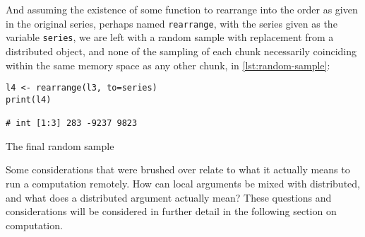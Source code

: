 And assuming the existence of some function to rearrange into the order
as given in the original series, perhaps named \texttt{rearrange}, with
the series given as the variable \texttt{series}, we are left with a
random sample with replacement from a distributed object, and none of
the sampling of each chunk necessarily coinciding within the same memory
space as any other chunk, in \ref{lst:random-sample}:

\begin{listing}
    \begin{verbatim}
l4 <- rearrange(l3, to=series)
print(l4)

# int [1:3] 283 -9237 9823
    \end{verbatim}
    \caption{The final random sample}
    \label{lst:random-sample}
\end{listing}

Some considerations that were brushed over relate to what it actually
means to run a computation remotely. How can local arguments be mixed
with distributed, and what does a distributed argument actually mean?
These questions and considerations will be considered in further detail
in the following section on computation.